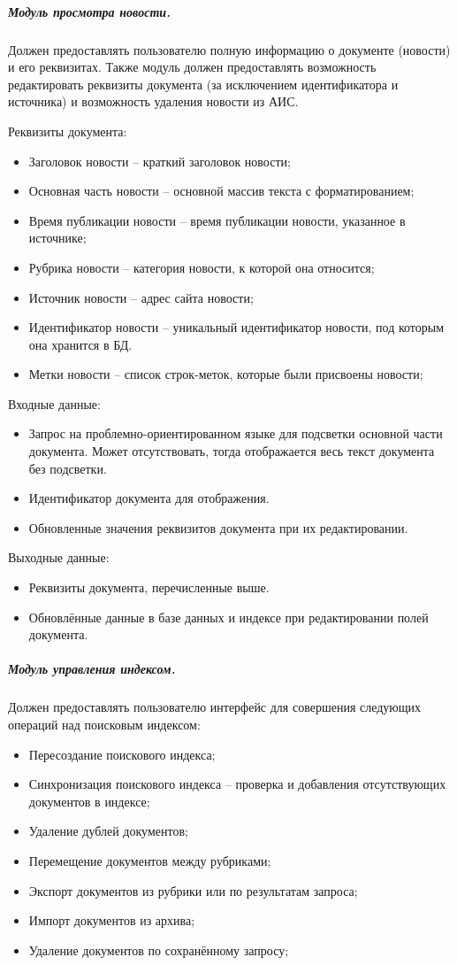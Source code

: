 \subparagraph{Модуль просмотра новости.} 
Должен предоставлять пользователю полную информацию о документе (новости) и его реквизитах. Также модуль должен предоставлять возможность редактировать реквизиты документа (за исключением идентификатора и источника) и возможность удаления новости из АИС.

Реквизиты документа:
\begin{itemize}
\item Заголовок новости -- краткий заголовок новости;
\item Основная часть новости -- основной массив текста с форматированием;
\item Время публикации новости -- время публикации новости, указанное в
источнике;
\item Рубрика новости -- категория новости, к которой она относится;
\item Источник новости -- адрес сайта новости;
\item Идентификатор новости -- уникальный идентификатор новости, под
которым она хранится в БД.
\item Метки новости -- список строк-меток, которые были присвоены новости;
\end{itemize}

Входные данные:
\begin{itemize}
\item Запрос на проблемно-ориентированном языке для подсветки основной части документа. Может отсутствовать, тогда отображается весь текст документа без подсветки.
\item Идентификатор документа для отображения.
\item Обновленные значения реквизитов документа при их редактировании.
\end{itemize}

Выходные данные:
\begin{itemize}
\item Реквизиты документа, перечисленные выше.
\item Обновлённые данные в базе данных и индексе при редактировании полей документа.
\end{itemize}

\subparagraph{Модуль управления индексом.}
Должен предоставлять пользователю интерфейс для совершения следующих
операций над поисковым индексом:
\begin{itemize}
\item Пересоздание поискового индекса;
\item Синхронизация поискового индекса -- проверка и добавления отсутствующих документов в индексе;
\item Удаление дублей документов;
\item Перемещение документов между рубриками; 
\item Экспорт документов из рубрики или по результатам запроса;
\item Импорт документов из архива;
\item Удаление документов по сохранённому запросу;
\end{itemize}

